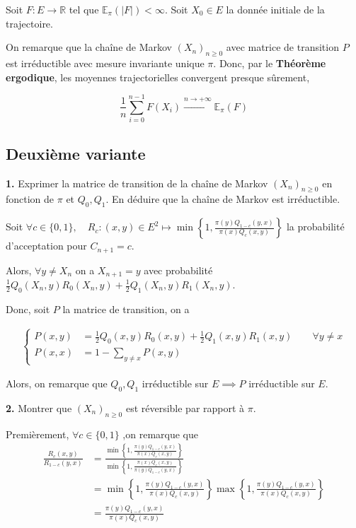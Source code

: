 \documentclass[french]{article}
\begin{document}
	Soit $F: E \to \mathbb{R}$ tel que $\mathbb{E}_{\pi}(|F|) < \infty$. Soit $X_0 \in E$ la donnée initiale de la trajectoire.
	
	On remarque que la chaîne de Markov	$(X_n)_{n \geq 0}$ avec matrice de transition $P$ est irréductible avec mesure invariante unique $\pi$. Donc, par le \textbf{Théorème ergodique}, les moyennes  trajectorielles convergent presque sûrement,
	
	$$ \frac{1}{n} \sum_{i=0}^{n-1} F(X_i)  \xrightarrow[]{n \to +\infty} \mathbb{E}_{\pi}(F) $$	

	
	
	\subsection*{Deuxième variante}
	
	\begin{tcolorbox}[colback=gray!5!white,colframe=gray!75!black]
		\textbf{1.} Exprimer la matrice de transition de la chaîne de Markov $(X_n)_{n \geq 0}$ en fonction de $\pi$ et $Q_0, Q_1$. En déduire que la chaîne de Markov est irréductible.
	\end{tcolorbox}
	
	Soit $\forall c \in \{0,1\}, \quad  R_c: (x,y) \in E^2 \mapsto \min\left\{1, \frac{\pi(y) Q_{1-c}(y, x)}{\pi(x) Q_c(x,y)} \right\}$ la probabilité d'acceptation pour $C_{n+1} = c$.
	
	Alors, $\forall y \not= X_n$ on a $X_{n+1} = y$ avec probabilité $\frac{1}{2}Q_0(X_n, y)R_0(X_n, y) + \frac{1}{2}Q_1(X_n, y)R_1(X_n, y)$.
	
	Donc, soit $P$ la matrice de transition, on a
	
	\begin{align}
	\begin{cases}
	P(x, y) &= \frac{1}{2}Q_0(x, y)R_0(x, y) + \frac{1}{2}Q_1(x, y)R_1(x, y) \qquad \forall y \not=x \\
	P(x, x) &= 1 - \sum_{y \not= x} P(x,y)
	\end{cases}
	\end{align}
	
	Alors, on remarque que $Q_0, Q_1$ irréductible sur $E \implies P$ irréductible sur $E$. 
	
	\begin{tcolorbox}[colback=gray!5!white,colframe=gray!75!black]
		\textbf{2.} Montrer que $(X_n)_{n \geq 0}$ est réversible par rapport à $\pi$.
	\end{tcolorbox}

	Premièrement, $\forall c \in \{0,1\}$ ,on remarque que 
	\begin{align}
		\frac{R_c(x,y)}{R_{1-c}(y,x)} &= \frac{\min\left\{1, \frac{\pi(y) Q_{1-c}(y,x)}{\pi(x) Q_c(x,y)} \right\}}{\min\left\{1, \frac{\pi(x) Q_c(x,y)}{\pi(y) Q_{1-c}(y,x)} \right\}}\\
		&= \min\left\{1, \frac{\pi(y) Q_{1-c}(y,x)}{\pi(x) Q_c(x,y)} \right\} \max\left\{1, \frac{\pi(y) Q_{1-c}(y,x)}{\pi(x) Q_c(x,y)} \right\}\\
		&= \frac{\pi(y) Q_{1-c}(y,x)}{\pi(x) Q_c(x,y)}
	\end{align}
	
\end{document}

